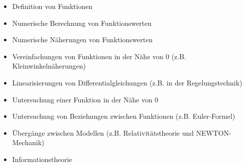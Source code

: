 \documentclass[10pt]{article}
\begin{document}
\begin{itemize}
  \item Definition von Funktionen
  \item Numerische Berechnung von Funktionswerten
  \item Numerische Näherungen von Funktionswerten
  \item Vereinfachungen von Funktionen in der Nähe von 0 (z.B. Kleinwinkelnäherungen)
  \item Linearisierungen von Differentialgleichungen (z.B. in der Regelungstechnik)
  \item Untersuchung einer Funktion in der Nähe von 0
  \item Untersuchung von Beziehungen zwischen Funktionen (z.B. Euler-Formel)
  \item Übergänge zwischen Modellen (z.B. Relativitätstheorie und NEWTON-Mechanik)
  \item Informationstheorie
\end{itemize}
\end{document}
